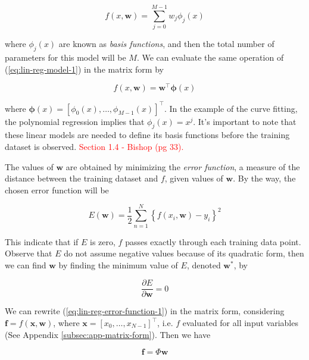 \documentclass[11pt]{article} %
\begin{document}
\begin{equation}
   f(x,\mathbf{w}) = \sum_{j=0}^{M-1} w_j \phi_j (x)
   \label{eq:lin-reg-model-1}
\end{equation}

where $\phi_j (x)$ are known as \textit{basis functions}, and then the total number of parameters for this model will be $M$. We can evaluate the same operation of (\ref{eq:lin-reg-model-1}) in the matrix form by

\begin{equation}
   f(x,\mathbf{w}) = \mathbf{w}^\top \boldsymbol{\phi}(x)
   \label{eq:lin-reg-model-1-matrix-form}
\end{equation}

where $\boldsymbol{\phi}(x) = \left[ \phi_0(x), \dots, \phi_{M-1}(x) \right]^\top$. In the example of the curve fitting, the polynomial regression implies that $\phi_j(x)=x^j$. It's important to note that these linear models are needed to define its basis functions before the training dataset is observed. \textcolor{red}{Section 1.4 - Bishop (pg 33).}

The values of $\mathbf{w}$ are obtained by minimizing the \textit{error function}, a measure of the distance between the training dataset and $f$, given values of $\mathbf{w}$. By the way, the chosen error function will be 

\begin{equation}
   E(\mathbf{w}) = \frac{1}{2} \sum_{n=1}^N \left\{ f(x_i,\mathbf{w})-y_i \right\}^2
   \label{eq:lin-reg-error-function-1}
\end{equation}

This indicate that if $E$ is zero, $f$ passes exactly through each training data point. Observe that $E$ do not assume negative values because of its quadratic form, then we can find $\mathbf{w}$ by finding the minimum value of $E$, denoted $\mathbf{w^*}$, by

\begin{equation}
   \frac{\partial E}{\partial \mathbf{w}} = 0
\end{equation}

We can rewrite (\ref{eq:lin-reg-error-function-1}) in the matrix form, considering $\mathbf{f} = f(\mathbf{x},\mathbf{w})$, where $\mathbf{x}=\left[ x_0,\dots, x_{N-1} \right]^\top$, i.e. $f$ evaluated for all input variables (See Appendix \ref{subsec:app-matrix-form}). Then we have

\begin{equation}
   \label{eq:lin-reg-error-function-matrix-form}
   \mathbf{f} = \Phi \mathbf{w}
\end{equation}
\end{document}
